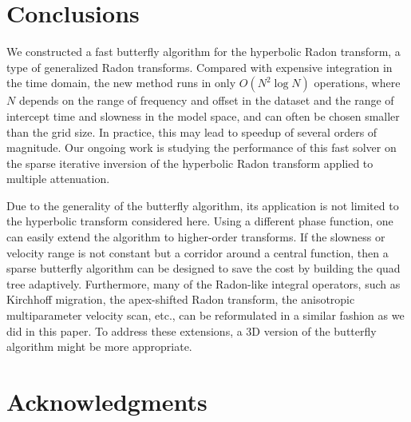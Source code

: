 



\section{Conclusions}

We constructed a fast butterfly algorithm for the hyperbolic Radon transform, a type of generalized Radon transforms. Compared with expensive integration in the time domain, the new method runs in only $O(N^2\log N)$ operations, where $N$ depends on the range of frequency and offset in the dataset and the range of intercept time and slowness in the model space, and can often be chosen smaller than the grid size. In practice, this may lead to speedup of several orders of magnitude. Our ongoing work is studying the performance of this fast solver on the sparse iterative inversion of the hyperbolic Radon transform applied to multiple attenuation.

Due to the generality of the butterfly algorithm, its application is not limited to the hyperbolic transform considered here. Using a different phase function, one can easily extend the algorithm to higher-order transforms. If the slowness or velocity range is not constant but a corridor around a central function, then a sparse butterfly algorithm can be designed to save the cost by building the quad tree adaptively. Furthermore, many of the Radon-like integral operators, such as Kirchhoff migration, the apex-shifted Radon transform, the anisotropic multiparameter velocity scan, etc., can be reformulated in a similar fashion as we did in this paper. To address these extensions, a 3D version of the butterfly algorithm might be more appropriate.



\section{Acknowledgments}

